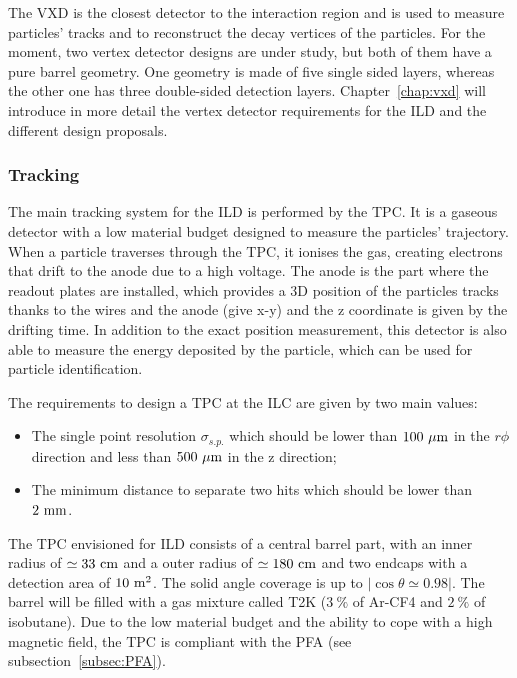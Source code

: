       The \gls{VXD} is the closest detector to the interaction region and is used to measure particles' tracks and to reconstruct the decay vertices of the particles.
      For the moment, two vertex detector designs are under study, but both of them have a pure barrel geometry.
      One geometry is made of five single sided layers, whereas the other one has three double-sided detection layers.
      Chapter~\ref{chap:vxd} will introduce in more detail the vertex detector requirements for the \gls{ILD} and the different design proposals.

      \subsubsection{Tracking}

      The main tracking system for the \gls{ILD} is performed by the \gls{TPC}.
      It is a gaseous detector with a low material budget designed to measure the particles' trajectory.
      When a particle traverses through the \gls{TPC}, it ionises the gas, creating electrons that drift to the anode due to a high voltage.
      The anode is the part where the readout plates are installed, which provides a 3D position of the particles tracks thanks to the wires and the anode (give x-y) and the z coordinate is given by the drifting time.
      In addition to the exact position measurement, this detector is also able to measure the energy deposited by the particle, which can be used for particle identification.

      The requirements to design a \gls{TPC} at the \gls{ILC} are given by two main values: 
      
      \begin{itemize} 
        \item The single point resolution $\sigma_{s.p.}$ which should be lower than $100~\rm{\mu m}$ in the $r\phi$ direction and less than $500~\rm{\mu m}$ in the z direction;
        \item The minimum distance to separate two hits which should be lower than $2~\rm{mm}$.
      \end{itemize}

      The \gls{TPC} envisioned for \gls{ILD} consists of a central barrel part, with an inner radius of $\simeq 33~\rm{cm}$ and a outer radius of $\simeq 180~\rm{cm}$ and two endcaps with a detection area of $10~\rm{m^2}$. 
      The solid angle coverage is up to $|\cos{\theta} \simeq 0.98|$.
      The barrel will be filled with a gas mixture called T2K ($3~\%$ of Ar-CF4 and $2~\%$ of isobutane).
      Due to the low material budget and the ability to cope with a high magnetic field, the \gls{TPC} is compliant with the \gls{PFA} (see subsection~\ref{subsec:PFA}). 


